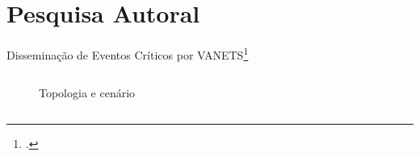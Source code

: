 \section{Pesquisa Autoral}
\begin{frame}{Disseminação de Eventos Críticos por VANETS\footcite{Andrade2021a,Andrade2021b}}
    \begin{columns}
        \begin{column}{0.65\textwidth}
            \begin{figure}
                \centering
                \quad
                \caption{Topologia e cenário}
                \label{fig:enter-label}
            \end{figure}    
        \end{column}
        \begin{column}{0.35\textwidth}
            \begin{figure}
                \centering

\end{figure}
\end{column}
\end{columns}
\end{frame}
